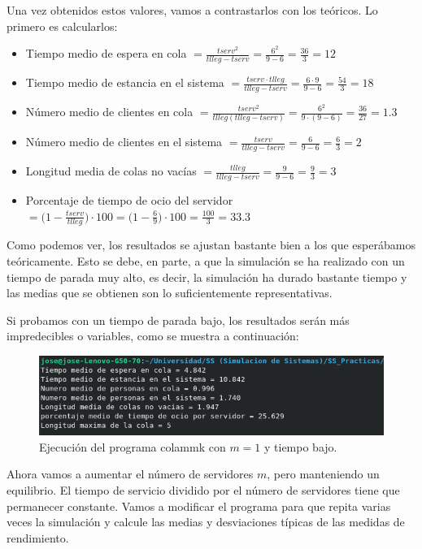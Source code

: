 \documentclass[11pt,a4paper]{report}
\begin{document}
Una vez obtenidos estos valores, vamos a contrastarlos con los teóricos. Lo primero es calcularlos:

\begin{itemize}[label=\textbullet]
	\item Tiempo medio de espera en cola
		  $= \frac{tserv^2}{tlleg-tserv} = \frac{6^2}{9-6} = \frac{36}{3} = 12$
	\item Tiempo medio de estancia en el sistema
		  $= \frac{tserv \cdot tlleg}{tlleg-tserv} = \frac{6 \cdot 9}{9-6} = \frac{54}{3} = 18$
	\item Número medio de clientes en cola
		  $= \frac{tserv^2}{tlleg (tlleg-tserv)} = \frac{6^2}{9\cdot (9-6)} = \frac{36}{27} = 1.3$
	\item Número medio de clientes en el sistema
		  $= \frac{tserv}{tlleg-tserv} = \frac{6}{9-6} = \frac{6}{3} = 2$
	\item Longitud media de colas no vacías
		  $= \frac{tlleg}{tlleg-tserv} = \frac{9}{9-6} = \frac{9}{3} = 3$
	\item Porcentaje de tiempo de ocio del servidor
		  $= \big(1 - \frac{tserv}{tlleg}\big) \cdot 100 = \big(1 - \frac{6}{9}\big) \cdot 100 = \frac{100}{3} = 33.3$
\end{itemize}

Como podemos ver, los resultados se ajustan bastante bien a los que esperábamos teóricamente. Esto se debe, en parte, a que la simulación se ha realizado con
un tiempo de parada muy alto, es decir, la simulación ha durado bastante tiempo y las medias que se obtienen son lo suficientemente representativas.

Si probamos con un tiempo de parada bajo, los resultados serán más impredecibles o variables, como se muestra a continuación:
\begin{figure}[H]
\centering
\includegraphics[scale=0.8]{img/cola2-m1.png}
\caption{Ejecución del programa colammk con $m=1$ y tiempo bajo.}
\end{figure}


Ahora vamos a aumentar el número de servidores $m$, pero manteniendo un equilibrio. El tiempo de servicio dividido por el número de servidores tiene que
permanecer constante. Vamos a modificar el programa para que repita varias veces la simulación y calcule las medias y desviaciones típicas de las medidas
de rendimiento.
\end{document}
